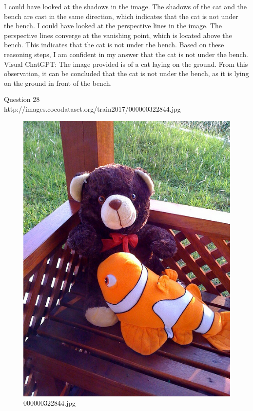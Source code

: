 \begin{enumerate}
        I could have looked at the shadows in the image. The shadows of the cat and the bench are cast in the same direction, which indicates that the cat is not under the bench.
        I could have looked at the perspective lines in the image. The perspective lines converge at the vanishing point, which is located above the bench. This indicates that the cat is not under the bench.
        Based on these reasoning steps, I am confident in my answer that the cat is not under the bench.
        \subitem Visual ChatGPT: The image provided is of a cat laying on the ground. From this observation, it can be concluded that the cat is not under the bench, as it is lying on the ground in front of the bench.
    \end{enumerate}
Question 28\\
    http://images.cocodataset.org/train2017/000000322844.jpg
    \begin{figure}[h]
        \centering
        \includegraphics[width=0.8\linewidth]{../image set/easy/000000322844.jpg}
        \caption{000000322844.jpg}
    \end{figure}
